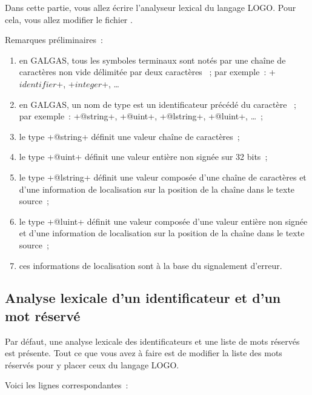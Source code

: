 Dans cette partie, vous allez écrire l’analyseur lexical du langage LOGO. Pour cela, vous allez modifier le fichier .

Remarques préliminaires~:
\begin{enumerate}
  \item en GALGAS, tous les symboles terminaux sont notés par une chaîne de caractères non vide délimitée par deux caractères \tpp{\$}~; par exemple~: \ggs+$identifier$+, \ggs+$integer$+, … 
  \item en GALGAS, un nom de type est un identificateur précédé du caractère ~; par exemple~: \ggs+@string+, \ggs+@uint+, \ggs+@lstring+, \ggs+@luint+, …~;
  \item le type \ggs+@string+ définit une valeur chaîne de caractères~;
  \item le type \ggs+@uint+ définit une valeur entière non signée sur 32 bits~;
  \item le type \ggs+@lstring+ définit une valeur composée d'une chaîne de caractères et d'une information de localisation sur la position de la chaîne dans le texte source~;
  \item le type \ggs+@luint+ définit une valeur composée d'une valeur entière non signée et d'une information de localisation sur la position de la chaîne dans le texte source~;
  \item ces informations de localisation sont à la base du signalement d'erreur.
\end{enumerate}

\subsection{Analyse lexicale d'un identificateur et d'un mot réservé}

Par défaut, une analyse lexicale des identificateurs et une liste de mots réservés est présente. Tout ce que vous avez à faire est de modifier la liste des mots réservés pour y placer ceux du langage LOGO.

Voici les lignes correspondantes~:


